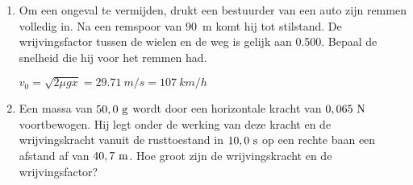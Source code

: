 \begin{enumerate}


\item Om een ongeval te vermijden, drukt een bestuurder van een auto zijn remmen volledig in. Na een remspoor van \SI{90}{m} komt hij tot stilstand. De wrijvingsfactor tussen de wielen en de weg is gelijk aan \SI{0,500}{}. Bepaal de snelheid die hij voor het remmen had.

\begin{oplossing}
$v_0=\sqrt{2\mu gx}=\SI{29,71}{m/s}=\SI{107}{km/h}$
\end{oplossing}

\item Een massa van $50,0~\rm g$ wordt door een horizontale kracht van $0,065~\rm N$ voortbewogen. Hij legt
onder de werking van deze kracht en de wrij\-vings\-kracht vanuit de rusttoestand in $10,0~\rm s$ op een rechte baan een afstand af van $40,7~\rm m$. Hoe groot zijn de wrijvingskracht en de wrijvingsfactor?


\end{enumerate}
